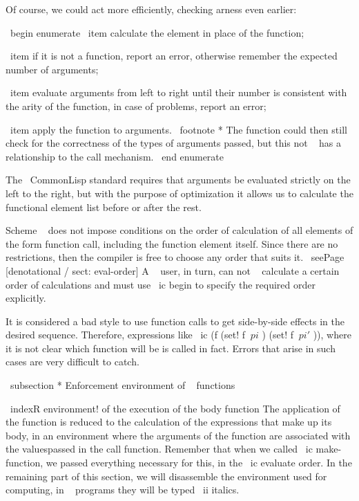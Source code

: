 {{Of course, we could act more efficiently, checking arness even earlier:

\ begin {enumerate}
  \ item calculate the element in place of the function;

  \ item if it is not a function, report an error, otherwise remember the expected
        number of arguments;

  \ item evaluate arguments from left to right until their number
        is consistent with the arity of the function, in case of problems, report an error;

  \ item apply the function to arguments. \ footnote * {The function could then
        still check for the correctness of the types of arguments passed, but this
        not ~ has a relationship to the call mechanism.}
\ end {enumerate}

The { \ CommonLisp } standard requires that arguments be evaluated strictly on the left
to the right, but with the purpose of optimization it allows us to calculate the functional element
list before or after the rest.

Scheme ~ does not impose conditions on the order of calculation of all elements of the form
function call, including the function element itself. Since there are no restrictions, then
the compiler is free to choose any order that suits it.
\ seePage [denotational / sect: eval-order] A ~ user, in turn, can not ~
calculate a certain order of calculations and must use
\ ic {begin} to specify the required order explicitly.

It is considered a bad style to use function calls to get side-by-side
effects in the desired sequence. Therefore, expressions like
\ ic {(f (set! f $ \ pi $ ) (set! f $ \ pi ' $ ))}, where it is not clear which function will be
is called in fact. Errors that arise in such cases are very difficult
to catch.


\ subsection * {Enforcement environment of ~ functions}

\ indexR {environment! of the execution of the body function}
The application of the function is reduced to the calculation of the expressions that make up its body,
in an environment where the arguments of the function are associated with the values ​​passed in the call
function. Remember that when we called \ ic {make-function}, we passed everything
necessary for this, in the \ ic {evaluate} order. In the remaining
part of this section, we will disassemble the environment used for computing,
in ~ programs they will be typed \ ii {italics}.


}}
